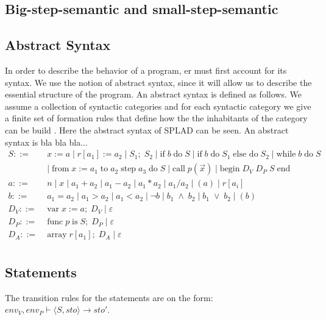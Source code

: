 \subsection{Big-step-semantic and small-step-semantic}

\subsection{Abstract Syntax}
In order to describe the behavior of a program, er must first account for its syntax. We use the notion of abstract syntax, since it will allow us to describe the essential structure of the program. An abstract syntax is defined as follows. We assume a collection of syntactic categories and for each syntactic category we give a finite set of formation rules that define how the the inhabitants of the category can be build \citep{HHTree}.
Here the abstract syntax of SPLAD can be seen. An abstract syntax is bla bla bla...
\begin{align*}
S::= \; & x := a \; | \; r[a_1] := a_2 \; | \; S_1; \; S_2 \; | \; \text{if} \; b \; \text{do} \; S \; | \; \text{if} \; b \; \text{do} \; S_1 \; \text{else do} \; S_2 \; | \; \text{while} \; b \; \text{do} \; S \\
~ & | \; \text{from} \; x := a_1 \; \text{to} \; a_2 \; \text{step} \; a_3 \; \text{do} \; S \; | \; \text{call} \; p(\vec{x}) \; | \; \text{begin} \; D_V \; D_P \; S \; \text{end} \\
a::= \; & n \; | \; x \; | \; a_1 + a_2 \; | \; a_1 - a_2 \; | \; a_1 * a_2 \; | \; a_1 / a_2 \; | \; (a) \; | \; r[a_i]\\
b::= \; &a_1 = a_2 \; | \; a_1 > a_2 \; | \; a_1 < a_2 \; | \; \neg b \; | \; b_1 \; \wedge \; b_2 \; | \; b_1 \; \vee \; b_2 \; | \; (b) \\
D_V::= \; & \text{var} \; x := a; \; D_V \; | \; \varepsilon \\
D_P::= \; & \text{func} \; p \; \text{is} \; S;\;  D_P \; | \; \varepsilon \\
D_A::= \; & \text{array} \; r[a_1]; \; D_A \; | \; \varepsilon \\
\end{align*}

\subsection{Statements}
The transition rules for the statements are on the form: $env_V, env_P \vdash \langle S, sto \rangle \rightarrow sto'$.


